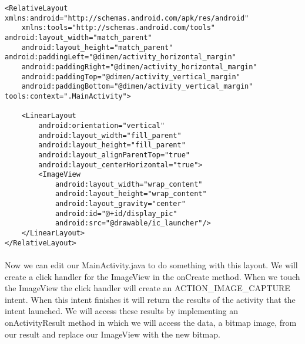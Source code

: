 \begin{lstlisting}
<RelativeLayout xmlns:android="http://schemas.android.com/apk/res/android"
    xmlns:tools="http://schemas.android.com/tools" android:layout_width="match_parent"
    android:layout_height="match_parent" android:paddingLeft="@dimen/activity_horizontal_margin"
    android:paddingRight="@dimen/activity_horizontal_margin"
    android:paddingTop="@dimen/activity_vertical_margin"
    android:paddingBottom="@dimen/activity_vertical_margin" tools:context=".MainActivity">

    <LinearLayout
        android:orientation="vertical"
        android:layout_width="fill_parent"
        android:layout_height="fill_parent"
        android:layout_alignParentTop="true"
        android:layout_centerHorizontal="true">
        <ImageView
            android:layout_width="wrap_content"
            android:layout_height="wrap_content"
            android:layout_gravity="center"
            android:id="@+id/display_pic"
            android:src="@drawable/ic_launcher"/>
    </LinearLayout>
</RelativeLayout>
\end{lstlisting}

\paragraph{} Now we can edit our MainActivity.java to do something with this layout. We will create a click handler for the ImageView in the onCreate method. When we touch the ImageView the click handler will create an ACTION\_IMAGE\_CAPTURE intent. When this intent finishes it will return the results of the activity that the intent launched. We will access these results by implementing an onActivityResult method in which we will access the data, a bitmap image, from our result and replace our ImageView with the new bitmap.

